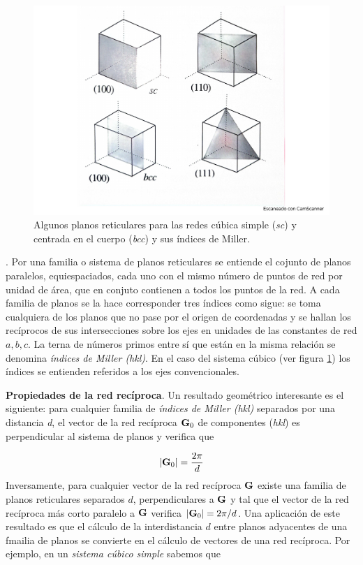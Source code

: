 \begin{figure}[h!] \centering
\includegraphics[scale=0.40]{Cuerpo/Ch_02/Fotos_libro 1.pdf}
\caption{Algunos planos reticulares para las redes cúbica simple (\textit{sc}) y centrada en el cuerpo (\textit{bcc}) y sus índices de Miller.}
\label{Fig:02-01}
\end{figure}

\begin{definition}. Por una familia o sistema de planos reticulares se entiende el cojunto de planos paralelos, equiespaciados, cada uno con el mismo número de puntos de red por unidad de área, que en conjuto contienen a todos los puntos de la red. A cada familia de planos se la hace corresponder tres índices como sigue: se toma cualquiera de los planos que no pase por el origen de coordenadas y se hallan los recíprocos de sus intersecciones sobre los ejes en unidades de las constantes de red $a,b,c$. La terna de números primos entre sí que están en la misma relación se denomina \textit{índices de Miller (hkl)}. En el caso del sistema cúbico (ver figura \ref{Fig:02-01}) los índices se entienden referidos a los ejes convencionales.    
\end{definition}


\textbf{Propiedades de la red recíproca}. Un resultado  geométrico interesante es el siguiente: para cualquier familia de \textit{índices de Miller (hkl)} separados por una distancia \textit{d}, el vector de la red recíproca $\mathbf{G}_0$ de componentes (\textit{hkl}) es perpendicular al sistema de planos y verifica que

\begin{equation}
|\mathbf{G}_0| = \frac{2\pi}{d} \label{Ec:02-01-05}
\end{equation}
Inversamente, para cualquier vector de la red recíproca $\mathbf{G}$ existe una familia de planos reticulares separados $d$, perpendiculares a $\mathbf{G}$ y tal que el vector de la red recíproca más corto paralelo a $\mathbf{G}$ verifica $|\mathbf{G}_0|=2\pi/d$. Una aplicación de este resultado es que el cálculo de la interdistancia $d$ entre planos adyacentes de una fmailia de planos se convierte en el cálculo de vectores de una red recíproca. Por ejemplo, en un \textit{sistema cúbico simple} sabemos que 

